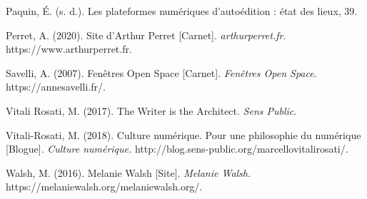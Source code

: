 \documentclass[10pt,french,letterpaper]{article}
\begin{document}
{\leavevmode\hypertarget{ref-paquin_les_nodate}{}%
Paquin, É. (s. d.). Les plateformes numériques d'autoédition : état des
lieux, 39.

\leavevmode\hypertarget{ref-perret_site_2020}{}%
Perret, A. (2020). Site d'Arthur Perret {[}Carnet{]}.
\emph{arthurperret.fr}. https://www.arthurperret.fr.

\leavevmode\hypertarget{ref-savelli_fenetres_2007}{}%
Savelli, A. (2007). Fenêtres Open Space {[}Carnet{]}. \emph{Fenêtres
Open Space}. https://annesavelli.fr/.

\leavevmode\hypertarget{ref-vitali_rosati_writer_2017}{}%
Vitali Rosati, M. (2017). The Writer is the Architect. \emph{Sens
Public}.

\leavevmode\hypertarget{ref-vitali-rosati_culture_2018}{}%
Vitali-Rosati, M. (2018). Culture numérique. Pour une philosophie du
numérique {[}Blogue{]}. \emph{Culture numérique.}
http://blog.sens-public.org/marcellovitalirosati/.

\leavevmode\hypertarget{ref-walsh_melanie_2016}{}%
Walsh, M. (2016). Melanie Walsh {[}Site{]}. \emph{Melanie Walsh}.
https://melaniewalsh.org/melaniewalsh.org/.}\raggedright
\end{document}
